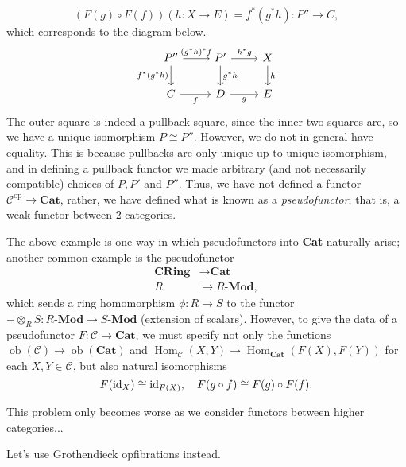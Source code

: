 \documentclass{MetricNotes2023}
\def\id{\ensuremath\text{id}}
\DeclareMathOperator{\Hom}{Hom}
\DeclareMathOperator{\ob}{ob}
\begin{document}
\[(F(g)\circ F(f))(h : X \to E)=f^*(g^*h) : P'' \to C,\] which corresponds to the diagram below.
\[\begin{tikzcd}
P'' \arrow[r, "(g^*h)^*f"] \arrow[d, swap, "f^*(g^*h)"]  & P' \arrow[r, "h^*g"] \arrow[d, "g^*h"] & X \arrow[d, "h"]  \\
C \arrow[r, swap, "f"]  & D \arrow[r, swap, "g"] & E
\end{tikzcd}\]
The outer square is indeed a pullback square, since the inner two squares are, so we have a unique isomorphism \(P \cong P''\). However, we do not in general have equality. This is because pullbacks are only unique up to unique isomorphism, and in defining a pullback functor we made arbitrary (and not necessarily compatible) choices of \(P, P'\) and \(P''\). Thus, we have not defined a functor \(\mathcal{C}^{\text{op}}\to \textbf{Cat}\), rather, we have defined what is known as a \textit{pseudofunctor}; that is, a weak functor between 2-categories. 

The above example is one way in which pseudofunctors into \textbf{Cat} naturally arise; another common example is the pseudofunctor
\begin{align*}
\textbf{CRing}&\to \textbf{Cat}\\
R\; &\mapsto R \textbf{-Mod},
\end{align*}
which sends a ring homomorphism \(\phi : R \to S\) to the functor \(-\otimes_R S : R \textbf{-Mod}\to S \textbf{-Mod}\) (extension of scalars). However, to give the data of a pseudofunctor \(F : \mathcal{C} \to \textbf{Cat}\), we must specify not only the functions \(\ob(\mathcal{C})\to \ob(\textbf{Cat})\) and \(\Hom_\mathcal{C}(X, Y)\to \Hom_\textbf{Cat}(F(X), F(Y))\) for each \(X, Y \in \mathcal{C}\), but also natural isomorphisms
\[F(\id_X) \cong \id_{F(X)}, \quad F(g \circ f) \cong F(g) \circ F(f).\]

This problem only becomes worse as we consider functors between higher categories...

Let's use Grothendieck opfibrations instead.
\end{document}
